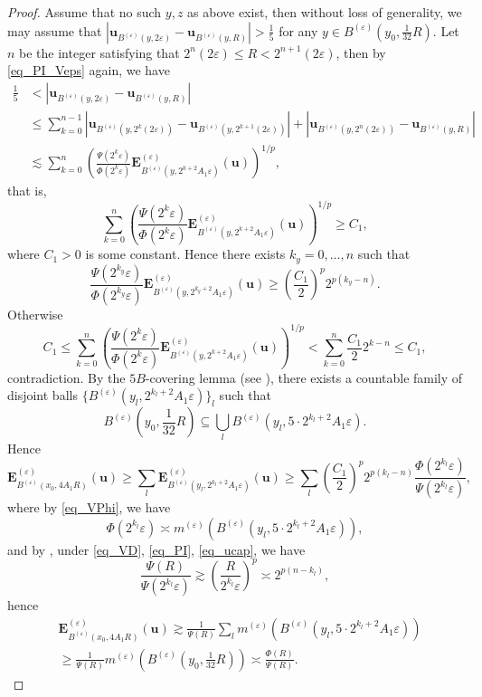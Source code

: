 \documentclass[11pt,a4paper]{article}
\numberwithin{equation}{section}
\theoremstyle{plain}
\theoremstyle{definition}
\begin{document}
\begin{proof}
Assume that no such $y,z$ as above exist, then without loss of generality, we may assume that $|\mathbf{u}_{B^{(\varepsilon)}(y,2\varepsilon)}-\mathbf{u}_{B^{(\varepsilon)}(y,R)}|>\frac{1}{5}$ for any $y\in B^{(\varepsilon)}(y_0,\frac{1}{32}R)$. Let $n$ be the integer satisfying that $2^n(2\varepsilon)\le R<2^{n+1}(2\varepsilon)$, then by \ref{eq_PI_Veps} again, we have
\begin{align*}
\frac{1}{5}&<|\mathbf{u}_{B^{(\varepsilon)}(y,2\varepsilon)}-\mathbf{u}_{B^{(\varepsilon)}(y,R)}|\\
&\le\sum_{k=0}^{n-1}|\mathbf{u}_{B^{(\varepsilon)}(y,2^k(2\varepsilon))}-\mathbf{u}_{B^{(\varepsilon)}(y,2^{k+1}(2\varepsilon))}|+|\mathbf{u}_{B^{(\varepsilon)}(y,2^{n}(2\varepsilon))}-\mathbf{u}_{B^{(\varepsilon)}(y,R)}|\\
&\lesssim\sum_{k=0}^n \left(\frac{\Psi(2^k\varepsilon)}{\Phi(2^k\varepsilon)}\mathbf{E}^{(\varepsilon)}_{B^{(\varepsilon)}(y,2^{k+2}A_1\varepsilon)}(\mathbf{u})\right)^{1/p},
\end{align*}
that is,
$$\sum_{k=0}^n \left(\frac{\Psi(2^k\varepsilon)}{\Phi(2^k\varepsilon)}\mathbf{E}^{(\varepsilon)}_{B^{(\varepsilon)}(y,2^{k+2}A_1\varepsilon)}(\mathbf{u})\right)^{1/p}\ge C_1,$$
where $C_1>0$ is some constant. Hence there exists $k_y=0,\ldots,n$ such that
$$\frac{\Psi(2^{k_y}\varepsilon)}{\Phi(2^{k_y}\varepsilon)}\mathbf{E}^{(\varepsilon)}_{B^{(\varepsilon)}(y,2^{k_y+2}A_1\varepsilon)}(\mathbf{u})\ge \left(\frac{C_1}{2}\right)^p2^{p(k_y-n)}.$$
Otherwise
$$C_1\le\sum_{k=0}^n \left(\frac{\Psi(2^k\varepsilon)}{\Phi(2^k\varepsilon)}\mathbf{E}^{(\varepsilon)}_{B^{(\varepsilon)}(y,2^{k+2}A_1\varepsilon)}(\mathbf{u})\right)^{1/p}<\sum_{k=0}^n \frac{C_1}{2} 2^{k-n}\le C_1,$$
contradiction. By the $5B$-covering lemma (see \cite[Theorem 1.2]{Hei01}), there exists a countable family of disjoint balls $\{B^{(\varepsilon)}(y_l,2^{k_l+2}A_1\varepsilon)\}_l$ such that
$$B^{(\varepsilon)}(y_0,\frac{1}{32}R)\subseteq \bigcup_{l}B^{(\varepsilon)}(y_l,5\cdot2^{k_l+2}A_1\varepsilon).$$
Hence
$$\mathbf{E}^{(\varepsilon)}_{B^{(\varepsilon)}(x_0,4A_1R)} (\mathbf{u})\ge\sum_{l}\mathbf{E}^{(\varepsilon)}_{B^{(\varepsilon)}(y_l,2^{k_l+2}A_1\varepsilon)}(\mathbf{u})\ge\sum_{l}\left(\frac{C_1}{2}\right)^p2^{p(k_l-n)}\frac{\Phi(2^{k_l}\varepsilon)}{\Psi(2^{k_l}\varepsilon)},$$
where by \ref{eq_VPhi}, we have
$$\Phi(2^{k_l}\varepsilon)\asymp{m^{(\varepsilon)}(B^{(\varepsilon)}(y_l,5\cdot2^{k_l+2}A_1\varepsilon))},$$
and by \cite[Proposition 2.1, Remark 2.2]{Yan25a}, under \ref{eq_VD}, \ref{eq_PI}, \ref{eq_ucap}, we have
$$\frac{\Psi(R)}{\Psi(2^{k_l}\varepsilon)}\gtrsim \left(\frac{R}{2^{k_l}\varepsilon}\right)^p\asymp 2^{p(n-k_l)},$$
hence
\begin{align*}
&\mathbf{E}^{(\varepsilon)}_{B^{(\varepsilon)}(x_0,4A_1R)} (\mathbf{u})\gtrsim\frac{1}{\Psi(R)}\sum_{l}{m^{(\varepsilon)}(B^{(\varepsilon)}(y_l,5\cdot2^{k_l+2}A_1\varepsilon))}\\
&\ge \frac{1}{\Psi(R)}m^{(\varepsilon)}(B^{(\varepsilon)}(y_0,\frac{1}{32}R))\asymp \frac{\Phi(R)}{\Psi(R)}.
\end{align*}
\end{proof}
\end{document}
